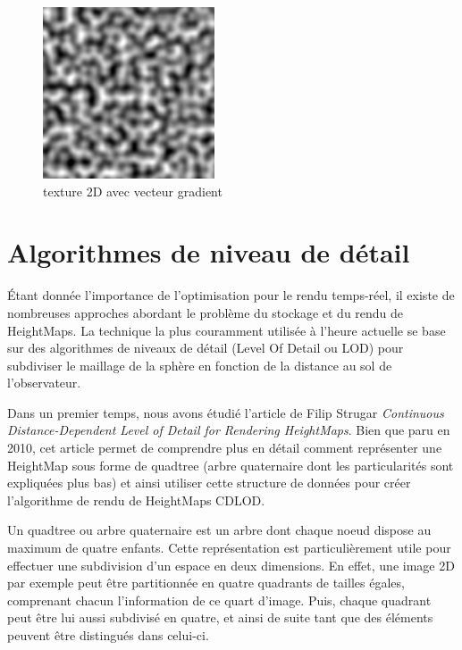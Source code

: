 \documentclass[12pt]{report}
\begin{document}
    \begin{figure}[h]
        \begin{center}
        \includegraphics[scale = 0.5]{images/gradientcoherentnoise2d.png}
        \caption{texture 2D avec vecteur gradient}
        \end{center}
    \end{figure}


\vspace*{1cm}


\section{Algorithmes de niveau de détail}

Étant donnée l'importance de l'optimisation pour le rendu temps-réel, il existe de nombreuses approches abordant le problème du stockage et du rendu de HeightMaps. La technique la plus couramment utilisée à l'heure actuelle se base sur des algorithmes de niveaux de détail (Level Of Detail ou LOD) pour subdiviser le maillage de la sphère en fonction de la distance au sol de l'observateur.

Dans un premier temps, nous avons étudié l'article de Filip Strugar \textit{Continuous Distance-Dependent Level of Detail for Rendering HeightMaps}\textbf{\cite{FStrugar}}. Bien que paru en 2010, cet article permet de comprendre plus en détail comment représenter une HeightMap sous forme de quadtree (arbre quaternaire dont les particularités sont expliquées plus bas) et ainsi utiliser cette structure de données pour créer l'algorithme de rendu de HeightMaps CDLOD.

Un quadtree ou arbre quaternaire est un arbre dont chaque noeud dispose au maximum de quatre enfants. Cette représentation est particulièrement utile pour effectuer une subdivision d'un espace en deux dimensions. En effet, une image 2D par exemple peut être partitionnée en quatre quadrants de tailles égales, comprenant chacun l'information de ce quart d'image. Puis, chaque quadrant peut être lui aussi subdivisé en quatre, et ainsi de suite tant que des éléments peuvent être distingués dans celui-ci.
\end{document}
